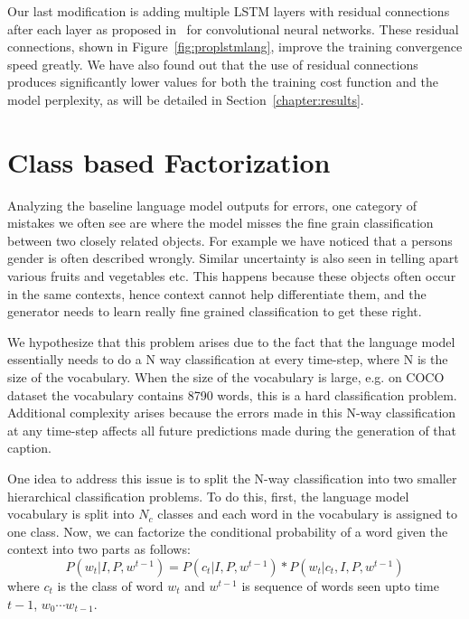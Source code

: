 Our last modification is adding multiple LSTM layers with residual connections
after each layer as proposed in~\cite{He2015} for convolutional neural networks.
These residual connections, shown in Figure~\ref{fig:proplstmlang}, improve the
training convergence speed greatly.
We have also found out that the use of residual connections produces
significantly lower values for both the training cost function and the model
perplexity, as will be detailed in Section~\ref{chapter:results}.

\section{Class based Factorization}
Analyzing the baseline language model outputs for errors, one category of
mistakes we often see are where the model misses the fine grain
classification between two closely related objects.
For example we have noticed that a persons gender is often described wrongly.
Similar uncertainty is also seen in telling apart various fruits and vegetables etc.
This happens because these objects often occur in the same contexts, hence
context cannot help differentiate them, and the generator needs to learn really
fine grained classification to get these right.

We hypothesize that this problem arises due to the fact that the language model
essentially needs to do a N way classification at every time-step, where N is
the size of the vocabulary.
When the size of the vocabulary is large, e.g. on COCO dataset the vocabulary
contains 8790 words, this is a hard classification problem.
Additional complexity arises because the errors made in this N-way
classification at any time-step affects all future predictions made during the
generation of that caption.

One idea to address this issue is to split the N-way classification into two
smaller hierarchical classification problems.
To do this, first, the language model vocabulary is split into $N_c$ classes and
each word in the vocabulary is assigned to one class. 
Now, we can factorize the conditional probability of a word given the context
into two parts as follows:
\begin{equation}
  \label{eq:class} 
  P(w_t | I,P, w^{t-1}) = P(c_t| I,P, w^{t-1})*P(w_t | c_t, I,P,w^{t-1})
\end{equation}
\noindent where $c_t$ is the class of word $w_t$ and $w^{t-1}$ is sequence of words
seen upto time $t-1$, $w_0\cdots w_{t-1}$.


